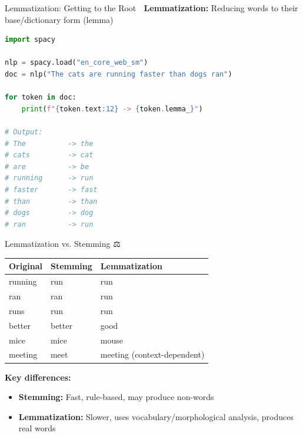 \documentclass[aspectratio=169]{beamer}
\begin{document}
\begin{frame}[fragile]{Lemmatization: Getting to the Root 🌱}
    \textbf{Lemmatization:} Reducing words to their base/dictionary form (lemma)

    \begin{lstlisting}[language=Python]
import spacy

nlp = spacy.load("en_core_web_sm")
doc = nlp("The cats are running faster than dogs ran")

for token in doc:
    print(f"{token.text:12} -> {token.lemma_}")

# Output:
# The          -> the
# cats         -> cat
# are          -> be
# running      -> run
# faster       -> fast
# than         -> than
# dogs         -> dog
# ran          -> run
    \end{lstlisting}
\end{frame}

\begin{frame}{Lemmatization vs. Stemming ⚖️}
    \begin{table}
        \centering
        \begin{tabular}{lll}
            \toprule
            \textbf{Original} & \textbf{Stemming} & \textbf{Lemmatization} \\
            \midrule
            running & run & run \\
            ran & ran & run \\
            runs & run & run \\
            better & better & good \\
            mice & mice & mouse \\
            meeting & meet & meeting (context-dependent) \\
            \bottomrule
        \end{tabular}
    \end{table}

    \vspace{1em}
    \textbf{Key differences:}
    \begin{itemize}\setlength{\itemsep}{0pt}
        \item \textbf{Stemming:} Fast, rule-based, may produce non-words
        \item \textbf{Lemmatization:} Slower, uses vocabulary/morphological analysis, produces real words
    \end{itemize}
\end{frame}
\end{document}
